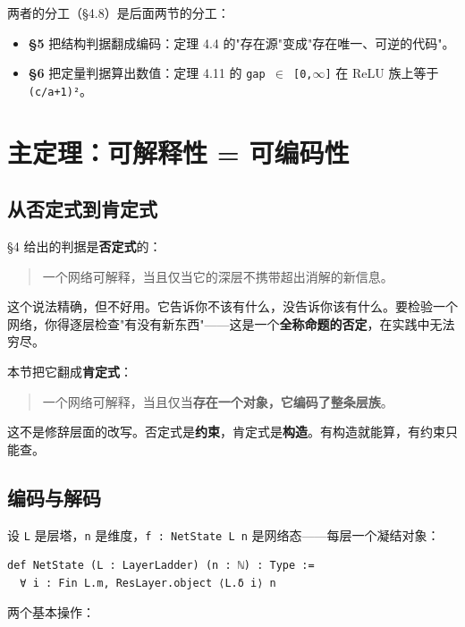 \documentclass[11pt,a4paper]{ctexart}
\begin{document}
两者的分工（§4.8）是后面两节的分工：

\begin{itemize}
\item \textbf{§5} 把结构判据翻成编码：定理 4.4 的"存在源"变成"存在唯一、可逆的代码"。
\item \textbf{§6} 把定量判据算出数值：定理 4.11 的 \texttt{gap \ensuremath{\in} [0,\ensuremath{\infty}]} 在 ReLU 族上等于 \texttt{(c/a+1)²}。
\end{itemize}

\bigskip

\section{主定理：可解释性 = 可编码性}

\subsection{从否定式到肯定式}

§4 给出的判据是\textbf{否定式}的：

\begin{quote}
一个网络可解释，当且仅当它的深层不携带超出消解的新信息。
\end{quote}

这个说法精确，但不好用。它告诉你不该有什么，没告诉你该有什么。要检验一个网络，你得逐层检查"有没有新东西"——这是一个\textbf{全称命题的否定}，在实践中无法穷尽。

本节把它翻成\textbf{肯定式}：

\begin{quote}
一个网络可解释，当且仅当\textbf{存在一个对象，它编码了整条层族}。
\end{quote}

这不是修辞层面的改写。否定式是\textbf{约束}，肯定式是\textbf{构造}。有构造就能算，有约束只能查。

\subsection{编码与解码}

设 \texttt{L} 是层塔，\texttt{n} 是维度，\texttt{f : NetState L n} 是网络态——每层一个凝结对象：

\begin{lstlisting}
def NetState (L : LayerLadder) (n : ℕ) : Type :=
  ∀ i : Fin L.m, ResLayer.object ⟨L.δ i⟩ n
\end{lstlisting}

两个基本操作：
\end{document}
